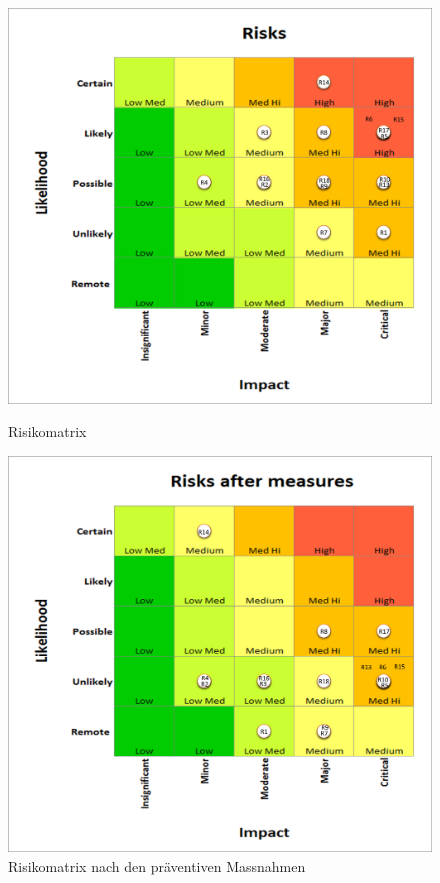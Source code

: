 \begin{figure}[H]
  \centering
  \begin{minipage}[t]{0.45\linewidth}
  \includegraphics[width=1.0\textwidth]{img/risikomanagement/Risks.png}
  \caption{Risikomatrix}
  \label{fig:risk-matrix}
  \end{minipage} 
  \hfill
  \begin{minipage}[t]{0.45\linewidth}
  \includegraphics[width=1.0\textwidth]{img/risikomanagement/RisksAfterMeasures.png}
  \caption{Risikomatrix nach den präventiven Massnahmen}
  \label{fig:risk-matrix-after-measures}
  \end{minipage}
\end{figure}

